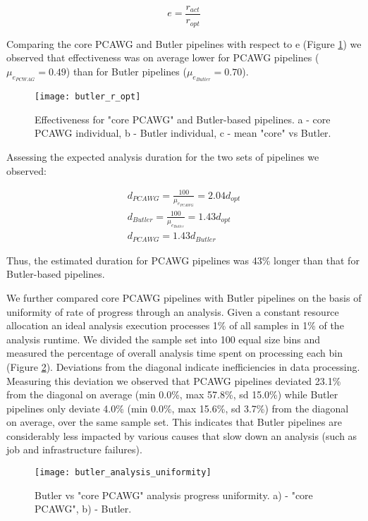 \begin{equation}
	e = \frac{r_{act}}{r_{opt}}
\end{equation}

Comparing the core PCAWG and Butler pipelines with respect to e (Figure \ref{fig:butler_r_opt}) we observed that effectiveness was on average lower for PCAWG pipelines ($\mu_{e_{PCWAG}}=0.49$) than for Butler pipelines ($\mu_{e_{Butler}}=0.70$). 

\begin{figure}[H]
\texttt{[image: butler\_r\_opt]}
\centering
\caption {Effectiveness for "core PCAWG" and Butler-based pipelines. a - core PCAWG individual, b - Butler individual, c - mean "core" vs Butler. }
\label{fig:butler_r_opt}
\end{figure}

Assessing the expected analysis duration for the two sets of pipelines we observed:

\begin{align}
	d_{PCAWG} = {\frac{100}{\mu_{e_{PCAWG}}}} = 2.04d_{opt} \\
	d_{Butler} = {\frac{100}{\mu_{e_{Butler}}}} = 1.43d_{opt} \\
	d_{PCAWG} = 1.43d_{Butler} 
\end{align}

Thus, the estimated duration for PCAWG pipelines was 43\% longer than that for Butler-based pipelines.

We further compared core PCAWG pipelines with Butler pipelines on the basis of uniformity of rate of progress through an analysis. Given a constant resource allocation an ideal analysis execution processes 1\% of all samples in 1\% of the analysis runtime. We divided the sample set into 100 equal size bins and measured the percentage of overall analysis time spent on processing each bin (Figure \ref{fig:butler_analysis_uniformity}). Deviations from the diagonal indicate inefficiencies in data processing. Measuring this deviation we observed that PCAWG pipelines deviated 23.1\% from the diagonal on average (min 0.0\%, max 57.8\%, sd 15.0\%) while Butler pipelines only deviate 4.0\% (min 0.0\%, max 15.6\%, sd 3.7\%) from the diagonal on average, over the same sample set. This indicates that Butler pipelines are considerably less impacted by various causes that slow down an analysis (such as job and infrastructure failures). 

\begin{figure}[H]
\texttt{[image: butler\_analysis\_uniformity]}
\centering
\caption {Butler vs "core PCAWG" analysis progress uniformity. a) - "core PCAWG", b) - Butler.}
\label{fig:butler_analysis_uniformity}
\end{figure}

